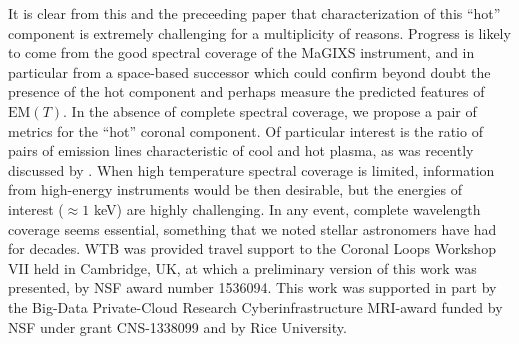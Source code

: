 \documentclass[preprint,linenumbers]{aastex}
\begin{document}
	\par It is clear from this and the preceeding paper that characterization of this ``hot'' component is extremely challenging for a multiplicity of reasons. Progress is likely to come from the good spectral coverage of the MaGIXS instrument, and in particular from a space-based successor which could confirm beyond doubt the presence of the hot component and perhaps measure the predicted features of $\mathrm{EM}(T)$. In the absence of complete spectral coverage, we propose a pair of metrics for the ``hot'' coronal component. Of particular interest is the ratio of pairs of emission lines characteristic of cool and hot plasma, as was recently discussed by \citet{brosius_pervasive_2014}. When high temperature spectral coverage is limited, information from high-energy instruments \citep{ishikawa_constraining_2014,hannah_first_2016,grefenstette_first_2016} would be then desirable, but the energies of interest ($\approx1$ keV) are highly challenging. In any event, complete wavelength coverage seems essential, something that we noted stellar astronomers have had for decades.
	\acknowledgments
	WTB was provided travel support to the Coronal Loops Workshop VII held in Cambridge, UK, at which a preliminary version of this work was presented, by NSF award number 1536094. This work was supported in part by the Big-Data Private-Cloud Research Cyberinfrastructure MRI-award funded by NSF under grant CNS-1338099 and by Rice University.
	
	
\end{document}

